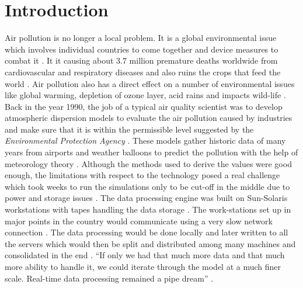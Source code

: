 \documentclass[sigconf]{acmart}
\begin{document}
\section{Introduction}
Air pollution is no longer a local problem. It is a global environmental issue which involves individual countries to come together and device measures to combat it \cite{www-ral}. It it causing about 3.7 million premature deaths worldwide from cardiovascular and respiratory diseases and also ruins the crops that feed the world \cite{www-ral}. Air pollution also has a direct effect on a number of environmental issues like global warming, depletion of ozone layer, acid rains and impacts wild-life \cite{www-ral}. \\
Back in the year 1990, the job of a typical air quality scientist was to develop atmospheric dispersion models to evaluate the air pollution caused by industries and make sure that it is within the permissible level suggested by the {\em Environmental Protection Agency} \cite{www-ibm1}. These models gather historic data of many years from airports and weather balloons to predict the pollution with the help of meteorology theory \cite{www-ibm1}. Although the methods used to derive the values were good enough, the limitations with respect to the technology posed a real challenge which took weeks to run the simulations only to be cut-off in the middle due to power and storage issues \cite{www-ibm1}. The data processing engine was built on Sun-Solaris workstations with tapes handling the data storage \cite{www-ibm1}. The work-stations set up in major points in the country would communicate using a very slow network connection \cite{www-ibm1}. The data processing would be done locally and later written to all the servers which would then be split and distributed among many machines and consolidated in the end \cite{www-ibm1}. ``If only we had that much more data and that much more ability to handle it, we could iterate through the model at a much finer scale. Real-time data processing remained a pipe dream'' \cite{www-ibm1}. \\
\end{document}
